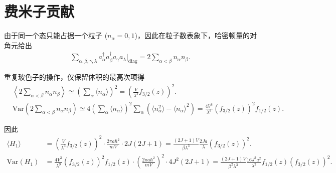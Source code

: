 \section{费米子贡献}

由于同一个态只能占据一个粒子 (\(n_{\alpha} = 0, 1\))，因此在粒子数表象下，哈密顿量的对角元给出
\begin{align*}
	\sum_{\alpha,\beta,\gamma,\lambda} a_{\alpha}^{\dagger} a_{\beta}^{\dagger} a_{\gamma} a_{\lambda}\Big|_{\text{diag}} = 2 \sum_{\alpha < \beta} n_{\alpha} n_{\beta}.
\end{align*}

重复玻色子的操作，仅保留体积的最高次项得
\begin{align*}
	&\left\langle 2 \sum_{\alpha < \beta} n_{\alpha} n_{\beta} \right\rangle \simeq \left( \sum_{\alpha} \langle n_{\alpha} \rangle \right)^{2} = \left( \frac{V}{\lambda^{3}} f_{3/2}(z) \right)^{2}.\\
	&\mathrm{Var}\left( 2 \sum_{\alpha < \beta} n_{\alpha} n_{\beta} \right) \simeq 4 \left( \sum_{\alpha} \langle n_{\alpha} \rangle \right)^{2} \sum_{\alpha} \left( \langle n_{\alpha}^{2} \rangle - \langle n_{\alpha} \rangle^{2} \right) = \frac{4V^{3}}{\lambda^{9}} (f_{3/2}(z))^{2} f_{1/2}(z).
\end{align*}

因此
\begin{align*}
	\langle H_{1} \rangle &= \left( \frac{V}{\lambda^{3}} f_{3/2}(z) \right)^{2} \cdot \frac{2\pi a \hbar^{2}}{m V} \cdot 2J(2J+1) = \frac{(2J+1) V}{\beta \lambda^{3}} \frac{2J a}{\lambda} (f_{3/2}(z))^{2}. \\
	\mathrm{Var}(H_{1}) &= \frac{4V^{3}}{\lambda^{9}} (f_{3/2}(z))^{2} f_{1/2}(z) \cdot \left( \frac{2\pi a \hbar^{2}}{m V} \right)^{2} \cdot 4J^{2}(2J+1) = \frac{(2J+1) V}{\beta^{2} \lambda^{3}} \frac{16J^{2} a^{2}}{\lambda^{2}} f_{1/2}(z) (f_{3/2}(z))^{2}.
\end{align*}

